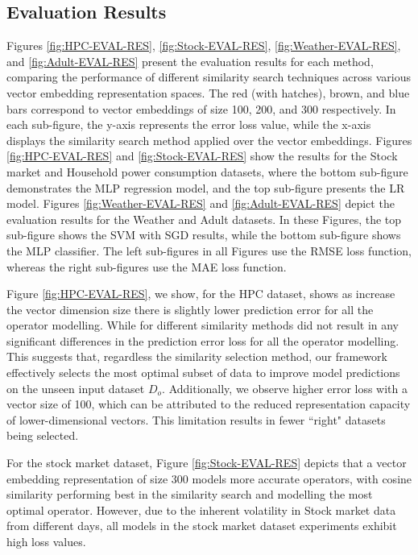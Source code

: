 \subsection{Evaluation Results}



Figures \ref{fig:HPC-EVAL-RES}, \ref{fig:Stock-EVAL-RES}, \ref{fig:Weather-EVAL-RES}, and \ref{fig:Adult-EVAL-RES} present the evaluation results for each method, comparing the performance of different similarity search techniques across various vector embedding representation spaces. The red (with hatches), brown, and blue bars correspond to vector embeddings of size 100, 200, and 300 respectively. In each sub-figure, the y-axis represents the error loss value, while the x-axis displays the similarity search method applied over the vector embeddings. Figures \ref{fig:HPC-EVAL-RES} and \ref{fig:Stock-EVAL-RES} show the results for the Stock market and Household power consumption datasets, where the bottom sub-figure demonstrates the MLP regression model, and the top sub-figure presents the LR model. Figures \ref{fig:Weather-EVAL-RES} and \ref{fig:Adult-EVAL-RES} depict the evaluation results for the Weather and Adult datasets. In these Figures, the top sub-figure shows the SVM with SGD results, while the bottom sub-figure shows the MLP classifier. The left sub-figures in all Figures use the RMSE loss function, whereas the right sub-figures use the MAE loss function. 



Figure \ref{fig:HPC-EVAL-RES}, we show, for the HPC dataset, shows as increase the vector dimension size there is slightly lower prediction error for all the operator modelling. While for different similarity methods did not result in any significant differences in the prediction error loss for all the operator modelling. This suggests that, regardless the similarity selection method, our framework effectively selects the most optimal subset of data to improve model predictions on the unseen input dataset $D_o$. Additionally, we observe higher error loss with a vector size of 100, which can be attributed to the reduced representation capacity of lower-dimensional vectors. This limitation results in fewer ``right" datasets being selected.

For the stock market dataset, Figure \ref{fig:Stock-EVAL-RES} depicts that a vector embedding representation of size $300$ models more accurate operators, with cosine similarity performing best in the similarity search and modelling the most optimal operator. However, due to the inherent volatility in Stock market data from different days, all models in the stock market dataset experiments exhibit high loss values. 

